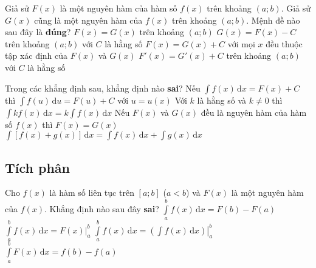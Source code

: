 \begin{ex}%
	Giả sử $F(x)$ là một nguyên hàm của hàm số $f(x)$ trên khoảng $(a;b)$. Giả sử $G(x)$ cũng là một nguyên hàm của $f(x)$ trên khoảng $(a;b)$. Mệnh đề nào sau đây là \textbf{đúng}?
	\choice
	{$F(x)=G(x)$ trên khoảng $(a;b)$}
	{\True $G(x)=F(x)-C$ trên khoảng $(a;b)$ với $C$ là hằng số}
	{$F(x)=G(x)+C$ với mọi $x$ đều thuộc tập xác định của $F(x)$ và $G(x)$}
	{$F'(x)=G'(x)+C$ trên khoảng $(a;b)$ với $C$ là hằng số}
\end{ex}

\begin{ex}%
	Trong các khẳng định sau, khẳng định nào \textbf{sai}?
	\choice
	{Nếu $\displaystyle\int\limits f(x) \mathrm{\,d}x =F(x)+C$ thì $\displaystyle\int\limits f(u) \mathrm{\,d}u=F(u)+C$ với $u=u(x)$}
	{Với $k$ là hằng số và $k\neq 0$ thì $\displaystyle\int\limits kf(x) \mathrm{\,d}x =k\displaystyle\int\limits f(x) \mathrm{\,d}x$}
	{\True Nếu $F(x)$ và $G(x)$ đều là nguyên hàm của hàm số $f(x)$ thì $F(x)=G(x)$}
	{$\displaystyle\int\limits \left[f(x)+g(x)\right] \mathrm{\,d}x =\displaystyle\int\limits f(x) \mathrm{\,d}x +\displaystyle\int\limits g(x) \mathrm{\,d}x$}
\end{ex}
\subsection{Tích phân}
\begin{ex}%
	Cho $f(x)$ là hàm số liên tục trên $[a;b]$ ($a <b$) và $F(x)$ là một nguyên hàm của $f(x)$. Khẳng định nào sau đây {\bf sai}?
	\choice
	{$\displaystyle\int\limits_a^b f(x) \mathrm{\,d}x =F(b)-F(a)$}
	{$\displaystyle\int\limits_a^b f(x) \mathrm{\,d}x = F(x) \Big|_a^b $}
	{$\displaystyle\int\limits_a^b f(x) \mathrm{\,d}x =\left.\left( \displaystyle\int\limits f(x) \mathrm{\,d}x \right)\right|_a^b$}
	{\True $\displaystyle\int\limits_a^b F(x) \mathrm{\,d}x =f(b)-f(a)$}
\end{ex}

